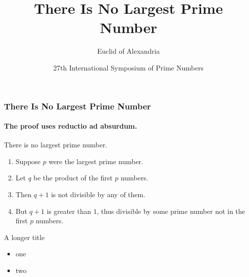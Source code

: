 \documentclass{beamer}
\title{There Is No Largest Prime Number}
\date[ISPN ’80]{27th International Symposium of Prime Numbers}
\author[Euclid]{Euclid of Alexandria}
\institute[]{}
\begin{document}
\begin{frame}
\titlepage
\end{frame}


\begin{frame} 
\frametitle{There Is No Largest Prime Number} 
\framesubtitle{The proof uses reductio ad absurdum.} 
\begin{theorem}
There is no largest prime number. \end{theorem} 
\begin{enumerate} 
\item<1-| alert@1> Suppose $p$ were the largest prime number. 
\item<2-> Let $q$ be the product of the first $p$ numbers. 
\item<3-> Then $q+1$ is not divisible by any of them. 
\item<1-> But $q + 1$ is greater than $1$, thus divisible by some prime
number not in the first $p$ numbers.
\end{enumerate}
\end{frame}

\begin{frame}{A longer title}
\begin{itemize}
\item one
\item two
\end{itemize}
\end{frame}
\end{document}
